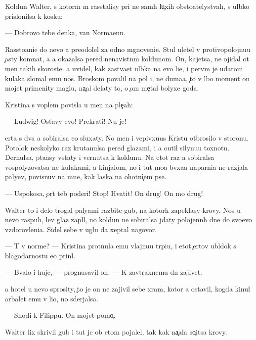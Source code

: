 \documentclass[10pt]{book}
\begin{document}
Koldun Walter, s kotor{\yi}m m{\yi} rasstalisy pri ne sam{\yi}h lu{\c}xih obsto{\y}atelystvah, s ul{\yi}bko{\y} prislonilsa k kos{\ia}ku:

— Dobrovo tebe den{\e}{\c}ka, van Normaenn.

Rassto{\y}ani{\y}e do nevo {\y}a preodolel za odno mgnoveni{\y}e. Stul uletel v protivopolojnu{\y}u {\c}asty komnat{\yi}, a {\y}a okazalsa pered nenavistn{\yi}m koldunom. On, kajetsa, ne ojidal ot men{\ia} takih skoroste{\y}. {\Y}a uvidel, kak zast{\yi}va{\y}et ul{\yi}bka na {\y}evo li{\q}e, i perv{\yi}m je udarom kulaka slomal {\y}emu nos. Broskom povalil na pol i, ne duma{\y}a, {\c}to v l{\iu}bo{\y} moment on mojet primenity magi{\y}u, na{\c}al delaty to, o {\c}om me{\c}tal bolyxe goda.

Kristina s voplem povisla u men{\ia} na ple{\c}ah:

— Ludwig! Ostavy {\y}evo! Prekrati! Nu je!

{\C}erta s dva {\y}a sobiralsa {\y}e{\y}o sluxaty. No men{\ia} i v{\q}epivxu{\y}us{\ia} Kristu otbrosilo v storonu. Potolok neskolyko raz krutanulsa pered glazami, i {\y}a o{\x}util silynu{\y}u toxnotu. Dernulsa, p{\yi}ta{\y}asy vstaty i vernutsa k koldunu. Na etot raz {\y}a sobiralsa vospolyzovatsa ne kulakami, a kinjalom, no i tut mo{\y}a b{\yi}vxa{\y}a naparni{\q}a ne razjala paly{\q}ev, povisnuv na mne, kak laska na ohotni{\c}{\y}em pse.

— Uspoko{\y}sa, {\c}ort teb{\ia} poderi! Stop! Hvatit! On drug! On mo{\y} drug!



Walter to i delo trogal paly{\q}ami razbit{\yi}{\y}e gub{\yi}, na kotor{\yi}h zapeklasy krovy. Nos u nevo raspuh, lev{\yi}{\y} glaz zapl{\yi}l, no koldun ne sobiralsa jdaty polojenn{\yi}h dne{\y} do svo{\y}evo v{\yi}zdorovleni{\y}a. Sidel sebe v uglu da xeptal nagovor{\yi}.

— T{\yi} v norme? — Kristina prot{\ia}nula {\y}emu vlajnu{\y}u tr{\ia}pi{\q}u, i etot {\c}ertov ubl{\iu}dok s blagodarnost{\y}u {\y}e{\y}o prin{\ia}l.

— B{\yi}valo i huje, — prognusavil on. — K zavtraxnemu dn{\iu} zajivet.

{\Y}a hotel u nevo sprosity, {\c}to je on ne zajivil sebe xram, kotor{\yi}{\y} {\y}a ostavil, kogda kinul arbalet {\y}emu v li{\q}o, no sderjalsa.

— Shodi k Filippu. On mojet pomo{\c}.

Walter lix skrivil gub{\yi} i tut je ob etom pojalel, tak kak na{\c}ala so{\c}itsa krovy.
\end{document}
